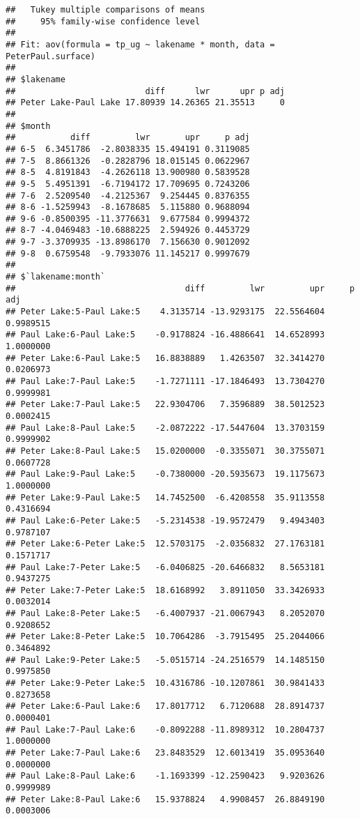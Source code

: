 \documentclass[]{article}
\begin{document}
\begin{verbatim}
##   Tukey multiple comparisons of means
##     95% family-wise confidence level
## 
## Fit: aov(formula = tp_ug ~ lakename * month, data = PeterPaul.surface)
## 
## $lakename
##                          diff      lwr      upr p adj
## Peter Lake-Paul Lake 17.80939 14.26365 21.35513     0
## 
## $month
##           diff         lwr       upr     p adj
## 6-5  6.3451786  -2.8038335 15.494191 0.3119085
## 7-5  8.8661326  -0.2828796 18.015145 0.0622967
## 8-5  4.8191843  -4.2626118 13.900980 0.5839528
## 9-5  5.4951391  -6.7194172 17.709695 0.7243206
## 7-6  2.5209540  -4.2125367  9.254445 0.8376355
## 8-6 -1.5259943  -8.1678685  5.115880 0.9688094
## 9-6 -0.8500395 -11.3776631  9.677584 0.9994372
## 8-7 -4.0469483 -10.6888225  2.594926 0.4453729
## 9-7 -3.3709935 -13.8986170  7.156630 0.9012092
## 9-8  0.6759548  -9.7933076 11.145217 0.9997679
## 
## $`lakename:month`
##                                  diff         lwr         upr     p adj
## Peter Lake:5-Paul Lake:5    4.3135714 -13.9293175  22.5564604 0.9989515
## Paul Lake:6-Paul Lake:5    -0.9178824 -16.4886641  14.6528993 1.0000000
## Peter Lake:6-Paul Lake:5   16.8838889   1.4263507  32.3414270 0.0206973
## Paul Lake:7-Paul Lake:5    -1.7271111 -17.1846493  13.7304270 0.9999981
## Peter Lake:7-Paul Lake:5   22.9304706   7.3596889  38.5012523 0.0002415
## Paul Lake:8-Paul Lake:5    -2.0872222 -17.5447604  13.3703159 0.9999902
## Peter Lake:8-Paul Lake:5   15.0200000  -0.3355071  30.3755071 0.0607728
## Paul Lake:9-Paul Lake:5    -0.7380000 -20.5935673  19.1175673 1.0000000
## Peter Lake:9-Paul Lake:5   14.7452500  -6.4208558  35.9113558 0.4316694
## Paul Lake:6-Peter Lake:5   -5.2314538 -19.9572479   9.4943403 0.9787107
## Peter Lake:6-Peter Lake:5  12.5703175  -2.0356832  27.1763181 0.1571717
## Paul Lake:7-Peter Lake:5   -6.0406825 -20.6466832   8.5653181 0.9437275
## Peter Lake:7-Peter Lake:5  18.6168992   3.8911050  33.3426933 0.0032014
## Paul Lake:8-Peter Lake:5   -6.4007937 -21.0067943   8.2052070 0.9208652
## Peter Lake:8-Peter Lake:5  10.7064286  -3.7915495  25.2044066 0.3464892
## Paul Lake:9-Peter Lake:5   -5.0515714 -24.2516579  14.1485150 0.9975850
## Peter Lake:9-Peter Lake:5  10.4316786 -10.1207861  30.9841433 0.8273658
## Peter Lake:6-Paul Lake:6   17.8017712   6.7120688  28.8914737 0.0000401
## Paul Lake:7-Paul Lake:6    -0.8092288 -11.8989312  10.2804737 1.0000000
## Peter Lake:7-Paul Lake:6   23.8483529  12.6013419  35.0953640 0.0000000
## Paul Lake:8-Paul Lake:6    -1.1693399 -12.2590423   9.9203626 0.9999989
## Peter Lake:8-Paul Lake:6   15.9378824   4.9908457  26.8849190 0.0003006

\end{verbatim}
\end{document}

